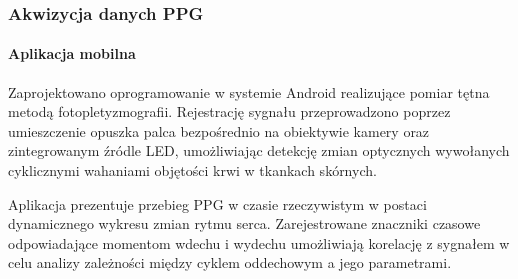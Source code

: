 \documentclass[journal]{IEEEtran}
\begin{document}
\subsubsection{Akwizycja danych PPG}
\paragraph{Aplikacja mobilna}
Zaprojektowano oprogramowanie w systemie Android realizujące pomiar tętna metodą fotopletyzmografii. Rejestrację sygnału przeprowadzono poprzez umieszczenie opuszka palca bezpośrednio na obiektywie kamery oraz zintegrowanym źródle LED, umożliwiając detekcję zmian optycznych wywołanych cyklicznymi wahaniami objętości krwi w tkankach skórnych.

Aplikacja prezentuje przebieg PPG w czasie rzeczywistym w postaci dynamicznego wykresu zmian rytmu serca. Zarejestrowane znaczniki czasowe odpowiadające momentom wdechu i wydechu umożliwiają korelację z sygnałem w celu analizy zależności między cyklem oddechowym a jego parametrami.
\end{document}
